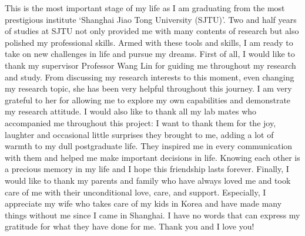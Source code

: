 \begin{thanks}
This is the most important stage of my life as I am graduating from the most prestigious
institute `Shanghai Jiao Tong University (SJTU)'. Two and half years of studies at SJTU not only provided me with many contents of research but also polished my professional skills. Armed with these tools and skills, I am ready to take on new challenges in life and pursue my dreams.
First of all, I would like to thank my supervisor Professor Wang Lin for guiding me
throughout my research and study. From discussing my research interests to this moment, even
changing my research topic, she has been very helpful throughout this journey. I am very grateful
to her for allowing me to explore my own capabilities and demonstrate my research attitude.
I would also like to thank all my lab mates who accompanied me throughout this project:
I want to thank them for the joy, laughter and occasional little surprises they brought to me,
adding a lot of warmth to my dull postgraduate life. They inspired me in every communication
with them and helped me make important decisions in life. Knowing each other is a precious
memory in my life and I hope this friendship lasts forever.
Finally, I would like to thank my parents and family who have always loved me and took
care of me with their unconditional love, care, and support. Especially, I appreciate my wife who takes care of my kids in Korea and have made many things without me since I came in Shanghai. I have no words that can express my gratitude for what they have done for me. Thank you and I love you!
\end{thanks}
